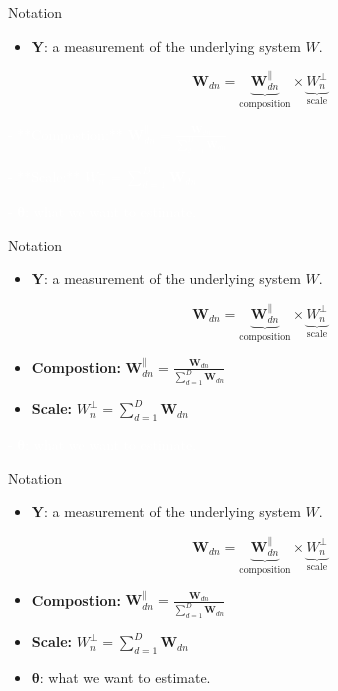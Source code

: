 \documentclass[
  ignorenonframetext,
]{beamer}
\providecommand{\tightlist}{%
  \setlength{\itemsep}{0pt}\setlength{\parskip}{0pt}}
\begin{document}
\begin{frame}{Notation}
\protect\hypertarget{notation}{}
\begin{itemize}
\tightlist
\item
  \(\mathbf{Y}\): a measurement of the underlying system \(W\).
\end{itemize}

\[\mathbf{W}_{dn} = \underbrace{\mathbf{W}_{dn}^\parallel}_{\text{composition}} \times  \underbrace{W_n^\perp}_{\text{scale}}\]

\textcolor{white}{- **Compostion:** $\mathbf{W}_{dn}^\parallel = \frac{\mathbf{W}_{dn}}{\sum_{d=1}^D \mathbf{W}_{dn}}$}

\textcolor{white}{- **Scale:** $W_n^\perp = \sum_{d=1}^D \mathbf{W}_{dn}$}

\textcolor{white}{- $\boldsymbol{\theta}$: what we want to estimate.}
\end{frame}

\begin{frame}{Notation}
\protect\hypertarget{notation-1}{}
\begin{itemize}
\tightlist
\item
  \(\mathbf{Y}\): a measurement of the underlying system \(W\).
\end{itemize}

\[\mathbf{W}_{dn} = \underbrace{\mathbf{W}_{dn}^\parallel}_{\text{composition}} \times  \underbrace{W_n^\perp}_{\text{scale}}\]

\begin{itemize}
\item
  \textbf{Compostion:}
  \(\mathbf{W}_{dn}^\parallel = \frac{\mathbf{W}_{dn}}{\sum_{d=1}^D \mathbf{W}_{dn}}\)
\item
  \textbf{Scale:} \(W_n^\perp = \sum_{d=1}^D \mathbf{W}_{dn}\)
\end{itemize}

\textcolor{white}{- $\boldsymbol{\theta}$: what we want to estimate.}
\end{frame}

\begin{frame}{Notation}
\protect\hypertarget{notation-2}{}
\begin{itemize}
\tightlist
\item
  \(\mathbf{Y}\): a measurement of the underlying system \(W\).
\end{itemize}

\[\mathbf{W}_{dn} = \underbrace{\mathbf{W}_{dn}^\parallel}_{\text{composition}} \times  \underbrace{W_n^\perp}_{\text{scale}}\]

\begin{itemize}
\item
  \textbf{Compostion:}
  \(\mathbf{W}_{dn}^\parallel = \frac{\mathbf{W}_{dn}}{\sum_{d=1}^D \mathbf{W}_{dn}}\)
\item
  \textbf{Scale:} \(W_n^\perp = \sum_{d=1}^D \mathbf{W}_{dn}\)
\item
  \(\boldsymbol{\theta}\): what we want to estimate.
\end{itemize}
\end{frame}
\end{document}
